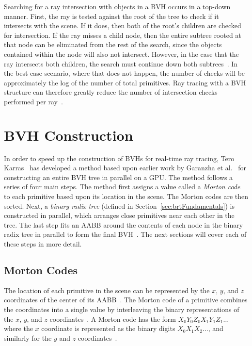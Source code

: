 \documentclass{sig-alternate}
\begin{document}
Searching for a ray intersection with objects in a BVH occurs in a top-down manner. First, the ray is tested against the root of the tree to check if it intersects with the scene. If it does, then both of the root's children are checked for intersection. If the ray misses a child node, then the entire subtree rooted at that node can be eliminated from the rest of the search, since the objects contained within the node will also not intersect. However, in the case that the ray intersects both children, the search must continue down both subtrees~\cite{Gribble:2012}. In the best-case scenario, where that does not happen, the number of checks will be approximately the log of the number of total primitives. Ray tracing with a BVH structure can therefore greatly reduce the number of intersection checks performed per ray~\cite{wiki:bvh}. 

\section{BVH Construction}
\label{sec:bvh}

In order to speed up the construction of BVHs for real-time ray tracing, Tero Karras~\cite{Karras:2012} has developed a method based upon earlier work by Garanzha et al.~\cite{Garanzha:2011} for constructing an entire BVH tree in parallel on a GPU. The method follows a series of four main steps. The method first assigns a value called a \emph{Morton code} to each primitive based upon its location in the scene. The Morton codes are then sorted. Next, a \emph{binary radix tree} (defined in Section~\ref{sec:brtFundamentals}) is constructed in parallel, which arranges close primitives near each other in the tree. The last step fits an AABB around the contents of each node in the binary radix tree in parallel to form the final BVH~\cite{Karras:2012}. The next sections will cover each of these steps in more detail.

\subsection{Morton Codes}
\label{sec:mortonCodes}

The location of each primitive in the scene can be represented by the $x$, $y$, and $z$ coordinates of the center of its AABB~\cite{Viitanen:2015, Wald:2007}. The Morton code of a primitive combines the coordinates into a single value by interleaving the binary representations of the $x$, $y$, and $z$ coordinates~\cite{Garanzha:2011}. A Morton code has the form \begin{math}X_{0}Y_{0}Z_{0}X_{1}Y_{1}Z_{1}\dots\end{math} where the $x$ coordinate is represented as the binary digits \begin{math}X_{0}X_{1}X_{2}\dots\end{math}, and similarly for the $y$ and $z$ coordinates~\cite{Karras:2012}.
\end{document}
